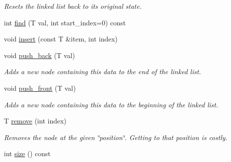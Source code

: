 \begin{DoxyCompactItemize}
\begin{DoxyCompactList}\small\item\em Resets the linked list back to its original state. \end{DoxyCompactList}\item 
int \mbox{\hyperlink{classssuds_1_1_linked_list_ad3d8caa4cbf9df3240578fa42868adf8}{find}} (T val, int start\+\_\+index=0) const
\item 
void \mbox{\hyperlink{classssuds_1_1_linked_list_ac9d11d83d9491a618575a9c50b8e2f2e}{insert}} (const T \&item, int index)
\item 
\mbox{\label{classssuds_1_1_linked_list_a36fa3d3dd5e7d7cdd96e116ae3d8b276}} 
void \mbox{\hyperlink{classssuds_1_1_linked_list_a36fa3d3dd5e7d7cdd96e116ae3d8b276}{push\+\_\+back}} (T val)
\begin{DoxyCompactList}\small\item\em Adds a new node containing this data to the end of the linked list. \end{DoxyCompactList}\item 
\mbox{\label{classssuds_1_1_linked_list_a050e2ac41033a04b990c4ceb7f29d5ed}} 
void \mbox{\hyperlink{classssuds_1_1_linked_list_a050e2ac41033a04b990c4ceb7f29d5ed}{push\+\_\+front}} (T val)
\begin{DoxyCompactList}\small\item\em Adds a new node containing this data to the beginning of the linked list. \end{DoxyCompactList}\item 
\mbox{\label{classssuds_1_1_linked_list_afca55993b7e531c4f89d0d787482af5b}} 
T \mbox{\hyperlink{classssuds_1_1_linked_list_afca55993b7e531c4f89d0d787482af5b}{remove}} (int index)
\begin{DoxyCompactList}\small\item\em Removes the node at the given \char`\"{}position\char`\"{}. Getting to that position is costly. \end{DoxyCompactList}\item 
int \mbox{\hyperlink{classssuds_1_1_linked_list_adb7155ceb5a5da5551cb080e3c229195}{size}} () const
\item 
\mbox{\label{classssuds_1_1_linked_list_ad3559cd0af6c9cf13fe03d0c1e164145}} 

\end{DoxyCompactItemize}

